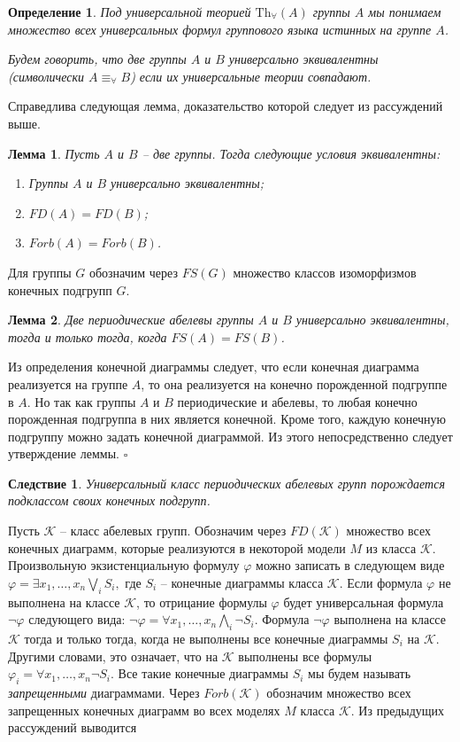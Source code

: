 \documentclass[a4paper,11pt,twoside]{article}
\newtheorem{lemma}{Лемма}[section]
\newtheorem{corollary}{Следствие}[section]
\newtheorem{definition}{Определение}[section]
\def\proof{{\noindent{\bf Доказательство.}} }
\def\K{{\mathcal{K}}}
\def\Tha{{\mathrm{Th}_\forall}}
\begin{document}
\begin{definition}
Под универсальной теорией $\Tha(A)$ группы $A$ мы понимаем множество всех универсальных формул группового языка истинных на группе $A$. 

Будем говорить, что две группы $A$ и $B$ универсально эквивалентны (символически $A \equiv_\forall B$) если их универсальные теории совпадают. 
\end{definition}
Справедлива следующая лемма, доказательство которой следует из рассуждений выше.

\begin{lemma}\label{lemma:UnivEquivForb}
Пусть $A$ и $B$ -- две группы. Тогда следующие условия эквивалентны:
\begin{enumerate}
\item Группы $A$ и $B$ универсально эквивалентны;
\item $FD(A) = FD(B)$;
\item $Forb(A) = Forb(B)$.
\end{enumerate}
\end{lemma}

Для группы $G$ обозначим через $FS(G)$ множество классов изоморфизмов конечных подгрупп $G$.

\begin{lemma}\label{lemma:UnivEquivFS}
Две периодические абелевы группы $A$ и $B$ универсально эквивалентны, тогда и только тогда, когда $FS(A) = FS(B)$.
\end{lemma}
\proof Из определения конечной диаграммы следует, что если конечная диаграмма реализуется на группе $A$, то она реализуется на конечно порожденной подгруппе в $A$. Но так как группы $A$ и $B$ периодические и абелевы, то любая конечно порожденная подгруппа в них является конечной. Кроме того, каждую конечную подгруппу можно задать конечной диаграммой. Из этого непосредственно следует утверждение леммы. $\square$

\begin{corollary}\label{cor:ClassPerdiodicAbelinaGroup}
Универсальный класс периодических абелевых групп порождается подклассом своих конечных подгрупп.
\end{corollary}

Пусть $\K$ -- класс абелевых групп. Обозначим через $FD(\K)$ множество всех конечных диаграмм, которые реализуются в некоторой модели $M$ из класса $\K$. Произвольную экзистенциальную формулу $\varphi$ можно записать в следующем виде $\varphi = \exists x_1, \ldots, x_n \bigvee\limits_{i} S_i,$ где $S_i$ -- конечные диаграммы класса $\K$. Если формула $\varphi$ не выполнена на классе $\K$, то отрицание формулы $\varphi$ будет универсальная формула $\neg \varphi$ следующего вида: $\neg \varphi = \forall x_1, \ldots, x_n \bigwedge\limits_{i} \neg S_i$. Формула $\neg \varphi$ выполнена на классе $\K$ тогда и только тогда, когда не выполнены все конечные диаграммы $S_i$ на $\K$. Другими словами, это означает, что на $\K$ выполнены все формулы $\varphi_i = \forall x_1, \ldots, x_n \neg S_i$. Все такие конечные диаграммы $S_i$ мы будем называть \textit{запрещенными} диаграммами. Через $Forb(\K)$ обозначим множество всех запрещенных конечных диаграмм во всех моделях $M$ класса $\K$. Из предыдущих рассуждений выводится
\end{document}
